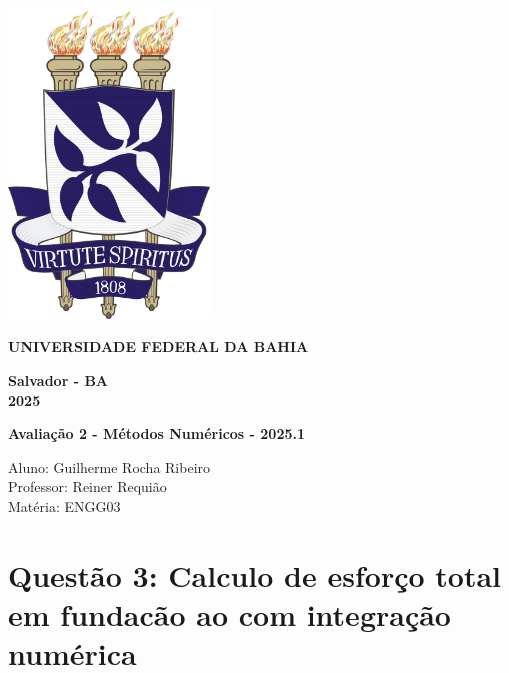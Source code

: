 \documentclass{article}
\begin{document}
\begin{titlepage}
    \centering
    
    \includegraphics[width=0.4\textwidth]{brasao_ufba.jpg} \\
    \vspace{1cm}
    
    \textbf{\large UNIVERSIDADE FEDERAL DA BAHIA} \\
    \vspace{12cm}
    
    \textbf{\large Salvador - BA} \\
    \textbf{\large 2025}
\end{titlepage}




\begin{center}
\large\textbf{Avaliação 2 - Métodos Numéricos - 2025.1} \\
\end{center}

\begin{flushleft}
Aluno: Guilherme Rocha Ribeiro \\
Professor: Reiner Requião \\
Matéria: ENGG03
\end{flushleft}

\section*{Questão 3:  Calculo de esforço total em fundacão ao com 
integração numérica}
\justifying
\end{document}
